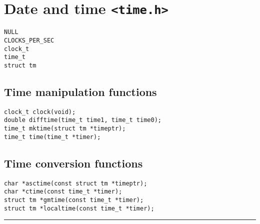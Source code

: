 \documentclass[a4paper,11pt,draft]{article}
\begin{document}
\section*{Date and time {\tt <time.h>}}

\begin{verbatim}
NULL
CLOCKS_PER_SEC
clock_t
time_t
struct tm
\end{verbatim}

\subsection*{Time manipulation functions}

\begin{verbatim}
clock_t clock(void);
double difftime(time_t time1, time_t time0);
time_t mktime(struct tm *timeptr);
time_t time(time_t *timer);
\end{verbatim}

\subsection*{Time conversion functions}

\begin{verbatim}
char *asctime(const struct tm *timeptr);
char *ctime(const time_t *timer);
struct tm *gmtime(const time_t *timer);
struct tm *localtime(const time_t *timer);
\end{verbatim}

\vspace{15mm}

\begin{center}
\rule{40mm}{.5pt}
\end{center}
\end{document}

